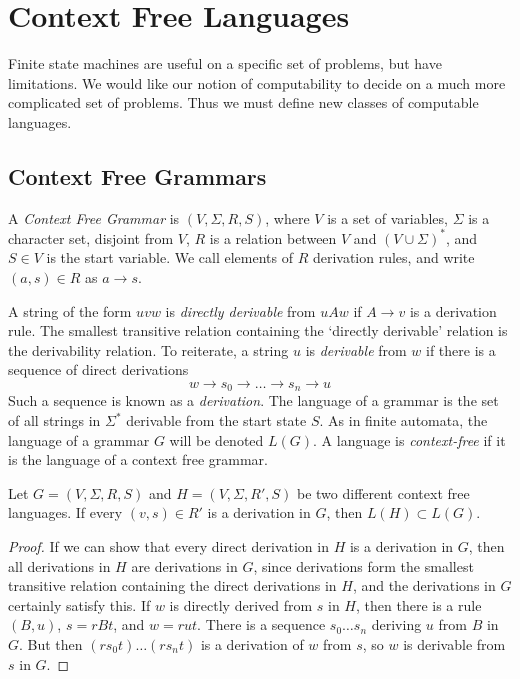 \chapter{Context Free Languages}

Finite state machines are useful on a specific set of problems, but have limitations. We would like our notion of computability to decide on a much more complicated set of problems. Thus we must define new classes of computable languages.

\section{Context Free Grammars}

\begin{definition}
    A \emph{Context Free Grammar} is $(V,\Sigma,R,S)$, where $V$ is a set of variables, $\Sigma$ is a character set, disjoint from $V$, $R$ is a relation between $V$ and $(V \cup \Sigma)^*$, and $S \in V$ is the start variable. We call elements of $R$ derivation rules, and write $(a,s) \in R$ as $a \rightarrow s$.
\end{definition}

A string of the form $uvw$ is \emph{directly derivable} from $uAw$ if $A \rightarrow v$ is a derivation rule. The smallest transitive relation containing the `directly derivable' relation is the derivability relation. To reiterate, a string $u$ is \emph{derivable} from $w$ if there is a sequence of direct derivations
%
\[ w \rightarrow s_0 \rightarrow \dots \rightarrow s_n \rightarrow u \]
%
Such a sequence is known as a \emph{derivation}. The language of a grammar is the set of all strings in $\Sigma^*$ derivable from the start state $S$. As in finite automata, the language of a grammar $G$ will be denoted $L(G)$. A language is \emph{context-free} if it is the language of a context free grammar.

\begin{lemma}
    Let $G = (V,\Sigma,R,S)$ and $H = (V,\Sigma,R',S)$ be two different context free languages. If every $(v,s) \in R'$ is a derivation in $G$, then $L(H) \subset L(G)$.
\end{lemma}
\begin{proof}
    If we can show that every direct derivation in $H$ is a derivation in $G$, then all derivations in $H$ are derivations in $G$, since derivations form the smallest transitive relation containing the direct derivations in $H$, and the derivations in $G$ certainly satisfy this. If $w$ is directly derived from $s$ in $H$, then there is a rule $(B,u)$, $s = rBt$, and $w = rut$. There is a sequence $s_0 \dots s_n$ deriving $u$ from $B$ in $G$. But then $(rs_0t) \dots (rs_nt)$ is a derivation of $w$ from $s$, so $w$ is derivable from $s$ in $G$.
\end{proof}

